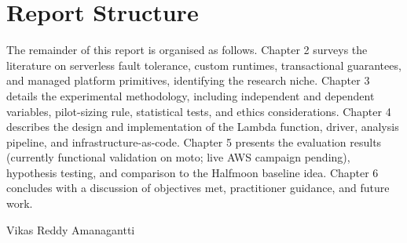 \section{Report Structure}

The remainder of this report is organised as follows. Chapter 2 surveys the literature on serverless fault tolerance, custom runtimes, transactional guarantees, and managed platform primitives, identifying the research niche. Chapter 3 details the experimental methodology, including independent and dependent variables, pilot-sizing rule, statistical tests, and ethics considerations. Chapter 4 describes the design and implementation of the Lambda function, driver, analysis pipeline, and infrastructure-as-code. Chapter 5 presents the evaluation results (currently functional validation on moto; live AWS campaign pending), hypothesis testing, and comparison to the Halfmoon baseline idea. Chapter 6 concludes with a discussion of objectives met, practitioner guidance, and future work.

Vikas Reddy Amanagantti
